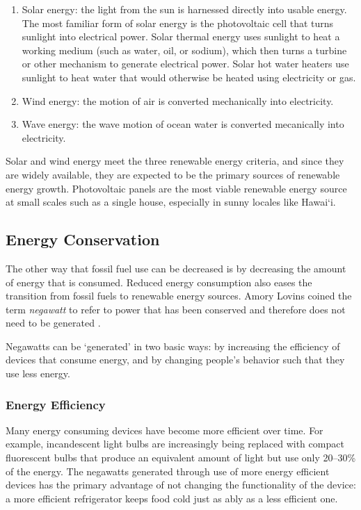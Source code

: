 \begin{enumerate}

\item Solar energy: the light from the sun is harnessed directly into usable energy. The most familiar form of solar energy is the photovoltaic cell that turns sunlight into electrical power. Solar thermal energy uses sunlight to heat a working medium (such as water, oil, or sodium), which then turns a turbine or other mechanism to generate electrical power. Solar hot water heaters use sunlight to heat water that would otherwise be heated using electricity or gas.

\item Wind energy: the motion of air is converted mechanically into electricity.

\item Wave energy: the wave motion of ocean water is converted mecanically into electricity.

\end{enumerate}

Solar and wind energy meet the three renewable energy criteria, and since they are widely available, they are expected to be the primary sources of renewable energy growth. Photovoltaic panels are the most viable renewable energy source at small scales such as a single house, especially in sunny locales like Hawai`i.

\subsection{Energy Conservation}

The other way that fossil fuel use can be decreased is by decreasing the amount of energy that is consumed. Reduced energy consumption also eases the transition from fossil fuels to renewable energy sources. Amory Lovins coined the term \emph{negawatt} to refer to power that has been conserved and therefore does not need to be generated \cite{Kolbert2007Mr-Green}.

Negawatts can be `generated' in two basic ways: by increasing the efficiency of devices that consume energy, and by changing people's behavior such that they use less energy.

\subsubsection{Energy Efficiency}

Many energy consuming devices have become more efficient over time. For example, incandescent light bulbs are increasingly being replaced with compact fluorescent bulbs that produce an equivalent amount of light but use only 20--30\% of the energy. The negawatts generated through use of more energy efficient devices has the primary advantage of not changing the functionality of the device: a more efficient refrigerator keeps food cold just as ably as a less efficient one.

